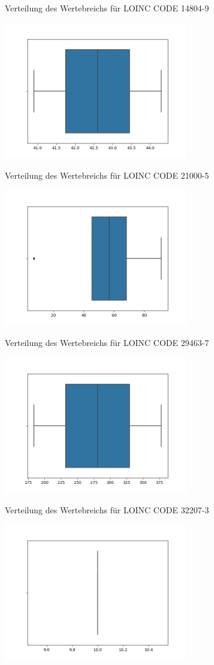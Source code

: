 \documentclass[12pt,a4paper,toc=bibliographynumbered,toc=indenttextentries]{scrreprt}
\begin{document}
\begin{center}
			\small{Verteilung des Wertebreichs für LOINC CODE 14804-9}
			
			\includegraphics[width=8cm]{Graphs/21000-5.png}
			
			\small{Verteilung des Wertebreichs für LOINC CODE 21000-5}
			
			\includegraphics[width=8cm]{Graphs/29463-7.png}
			
			\small{Verteilung des Wertebreichs für LOINC CODE 29463-7}
			
			\includegraphics[width=8cm]{Graphs/32207-3.png}
			
			\small{Verteilung des Wertebreichs für LOINC CODE 32207-3}
			
			\includegraphics[width=8cm]{Graphs/33914-3.png}
			

\end{center}
\end{document}
